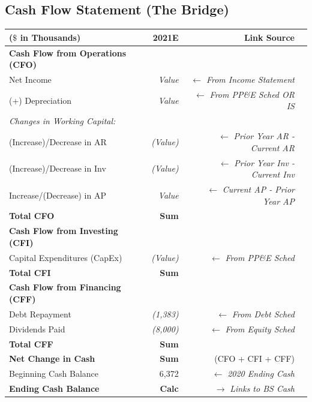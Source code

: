 \documentclass[11pt, letterpaper]{article}
\begin{document}
\subsection{Cash Flow Statement (The Bridge)}
\begin{table}[H]
\centering
\begin{tabular}{lrrr}
\toprule
\textbf{($\$$ in Thousands)} & \textbf{2021E} & \textbf{Link Source} \\
\midrule
\textbf{Cash Flow from Operations (CFO)} & & \\
Net Income & \textit{Value} & $\leftarrow$ \textit{From Income Statement} \\
(+) Depreciation & \textit{Value} & $\leftarrow$ \textit{From PP\&E Sched OR IS} \\
\textit{Changes in Working Capital:} & & \\
(Increase)/Decrease in AR & \textit{(Value)} & $\leftarrow$ \textit{Prior Year AR - Current AR} \\
(Increase)/Decrease in Inv & \textit{(Value)} & $\leftarrow$ \textit{Prior Year Inv - Current Inv} \\
Increase/(Decrease) in AP & \textit{Value} & $\leftarrow$ \textit{Current AP - Prior Year AP} \\
\textbf{Total CFO} & \textbf{Sum} & \\
\midrule
\textbf{Cash Flow from Investing (CFI)} & & \\
Capital Expenditures (CapEx) & \textit{(Value)} & $\leftarrow$ \textit{From PP\&E Sched} \\
\textbf{Total CFI} & \textbf{Sum} & \\
\midrule
\textbf{Cash Flow from Financing (CFF)} & & \\
Debt Repayment & \textit{(1,383)} & $\leftarrow$ \textit{From Debt Sched} \\
Dividends Paid & \textit{(8,000)} & $\leftarrow$ \textit{From Equity Sched} \\
\textbf{Total CFF} & \textbf{Sum} & \\
\midrule
\textbf{Net Change in Cash} & \textbf{Sum} & (CFO + CFI + CFF) \\
Beginning Cash Balance & 6,372 & $\leftarrow$ \textit{2020 Ending Cash} \\
\textbf{Ending Cash Balance} & \textbf{Calc} & $\rightarrow$ \textit{Links to BS Cash} \\
\bottomrule
\end{tabular}
\end{table}
\end{document}
